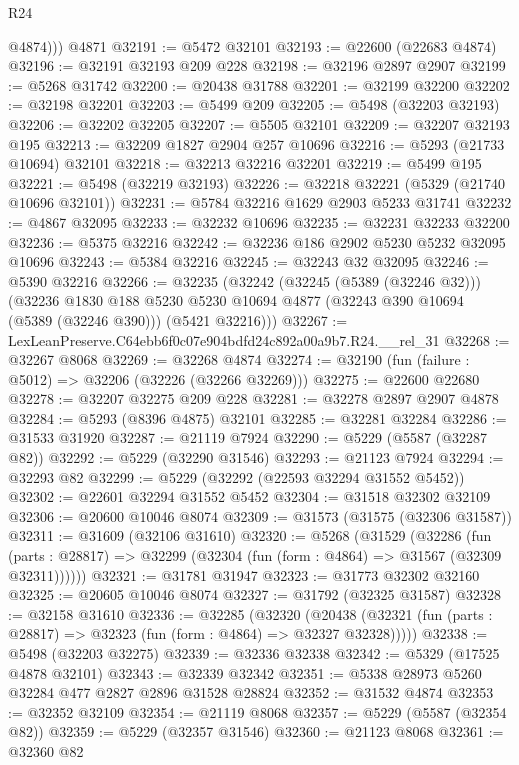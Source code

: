 \begin{lexlean}{R24}
\begin{coremodule}
          @4874)))
    @4871
@32191 := @5472 @32101
@32193 := @22600 (@22683 @4874)
@32196 := @32191 @32193 @209 @228
@32198 := @32196 @2897 @2907
@32199 := @5268 @31742
@32200 := @20438 @31788
@32201 := @32199 @32200
@32202 := @32198 @32201
@32203 := @5499 @209
@32205 := @5498 (@32203 @32193)
@32206 := @32202 @32205
@32207 := @5505 @32101
@32209 := @32207 @32193 @195
@32213 := @32209 @1827 @2904 @257 @10696
@32216 := @5293 (@21733 @10694) @32101
@32218 := @32213 @32216 @32201
@32219 := @5499 @195
@32221 := @5498 (@32219 @32193)
@32226 := @32218 @32221 (@5329 (@21740 @10696 @32101))
@32231 := @5784 @32216 @1629 @2903 @5233 @31741
@32232 := @4867 @32095
@32233 := @32232 @10696
@32235 := @32231 @32233 @32200
@32236 := @5375 @32216
@32242 := @32236 @186 @2902 @5230 @5232 @32095 @10696
@32243 := @5384 @32216
@32245 := @32243 @32 @32095
@32246 := @5390 @32216
@32266 := @32235
    (@32242
      (@32245 (@5389 (@32246 @32)))
      (@32236
        @1830
        @188
        @5230
        @5230
        @10694
        @4877
        (@32243 @390 @10694 (@5389 (@32246 @390)))
        (@5421 @32216)))
@32267 := LexLeanPreserve.C64ebb6f0c07e904bdfd24c892a00a9b7.R24.__rel_31
@32268 := @32267 @8068
@32269 := @32268 @4874
@32274 := @32190 (fun (failure : @5012) => @32206 (@32226 (@32266 @32269)))
@32275 := @22600 @22680
@32278 := @32207 @32275 @209 @228
@32281 := @32278 @2897 @2907 @4878
@32284 := @5293 (@8396 @4875) @32101
@32285 := @32281 @32284
@32286 := @31533 @31920
@32287 := @21119 @7924
@32290 := @5229 (@5587 (@32287 @82))
@32292 := @5229 (@32290 @31546)
@32293 := @21123 @7924
@32294 := @32293 @82
@32299 := @5229 (@32292 (@22593 @32294 @31552 @5452))
@32302 := @22601 @32294 @31552 @5452
@32304 := @31518 @32302 @32109
@32306 := @20600 @10046 @8074
@32309 := @31573 (@31575 (@32306 @31587))
@32311 := @31609 (@32106 @31610)
@32320 := @5268
    (@31529
      (@32286
        (fun (parts : @28817) => @32299 (@32304 (fun (form : @4864) => @31567 (@32309 @32311))))))
@32321 := @31781 @31947
@32323 := @31773 @32302 @32160
@32325 := @20605 @10046 @8074
@32327 := @31792 (@32325 @31587)
@32328 := @32158 @31610
@32336 := @32285
    (@32320
      (@20438 (@32321 (fun (parts : @28817) => @32323 (fun (form : @4864) => @32327 @32328)))))
@32338 := @5498 (@32203 @32275)
@32339 := @32336 @32338
@32342 := @5329 (@17525 @4878 @32101)
@32343 := @32339 @32342
@32351 := @5338 @28973 @5260 @32284 @477 @2827 @2896 @31528 @28824
@32352 := @31532 @4874
@32353 := @32352 @32109
@32354 := @21119 @8068
@32357 := @5229 (@5587 (@32354 @82))
@32359 := @5229 (@32357 @31546)
@32360 := @21123 @8068
@32361 := @32360 @82

\end{coremodule}
\end{lexlean}
